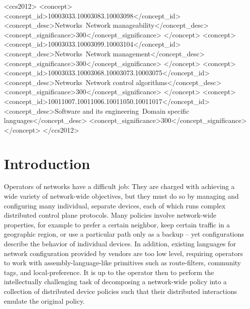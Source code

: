 \documentclass[10pt]{sig-alternate}
\begin{document}

\begin{CCSXML}
<ccs2012>
<concept>
<concept_id>10003033.10003083.10003098</concept_id>
<concept_desc>Networks~Network manageability</concept_desc>
<concept_significance>300</concept_significance>
</concept>
<concept>
<concept_id>10003033.10003099.10003104</concept_id>
<concept_desc>Networks~Network management</concept_desc>
<concept_significance>300</concept_significance>
</concept>
<concept>
<concept_id>10003033.10003068.10003073.10003075</concept_id>
<concept_desc>Networks~Network control algorithms</concept_desc>
<concept_significance>300</concept_significance>
</concept>
<concept>
<concept_id>10011007.10011006.10011050.10011017</concept_id>
<concept_desc>Software and its engineering~Domain specific languages</concept_desc>
<concept_significance>300</concept_significance>
</concept>
</ccs2012>
\end{CCSXML}


\printccsdesc


%
%
%
%

\section{Introduction}
 
Operators of networks have a difficult job: They are charged
with achieving a wide variety of network-wide objectives, but they must do so by
managing and configuring many individual, separate devices, each of which runs
complex distributed control plane protocols. 
Many policies involve network-wide properties, for example to prefer a certain neighbor, keep certain traffic in a geographic region, or use a particular path only as a backup -- yet configurations describe the behavior of individual devices.
%
In addition, existing languages
for network configuration provided by vendors are too low level, requiring operators to work with assembly-language-like primitives such as route-filters, community tags, and local-preference. 
%
It is up to the operator then to perform the intellectually challenging task of decomposing a network-wide policy into a collection of distributed device policies such that their distributed interactions emulate the original policy.
\end{document}
